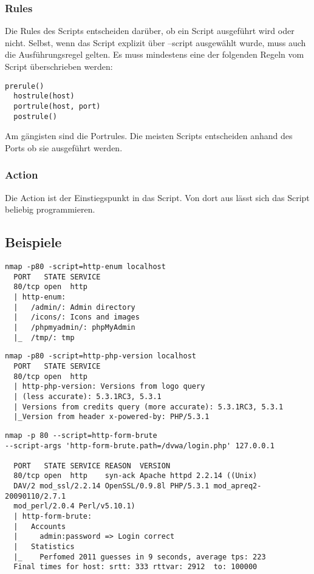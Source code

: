 \subsubsection{Rules} Die Rules des Scripts entscheiden darüber, ob
ein Script ausgeführt wird oder nicht. Selbst, wenn das Script
explizit über --script ausgewählt wurde, muss auch die
Ausführungsregel gelten. Es muss mindestens eine der folgenden Regeln
vom Script überschrieben werden:

\begin{lstlisting}[language={}]
  prerule() 
  hostrule(host)
  portrule(host, port)
  postrule()
\end{lstlisting}
  
Am gängisten sind die Portrules. Die meisten Scripts entscheiden
anhand des Ports ob sie ausgeführt werden.


\subsubsection{Action} Die Action ist der Einstiegspunkt in das
Script. Von dort aus lässt sich das Script beliebig programmieren.

\subsection{Beispiele}

\begin{lstlisting}[language={}]
nmap -p80 -script=http-enum localhost
  PORT   STATE SERVICE
  80/tcp open  http
  | http-enum:  
  |   /admin/: Admin directory
  |   /icons/: Icons and images
  |   /phpmyadmin/: phpMyAdmin
  |_  /tmp/: tmp
\end{lstlisting}

\begin{lstlisting}[language={}]
nmap -p80 -script=http-php-version localhost
  PORT   STATE SERVICE
  80/tcp open  http
  | http-php-version: Versions from logo query 
  | (less accurate): 5.3.1RC3, 5.3.1
  | Versions from credits query (more accurate): 5.3.1RC3, 5.3.1
  |_Version from header x-powered-by: PHP/5.3.1
\end{lstlisting}

\begin{lstlisting}[language={}]
nmap -p 80 --script=http-form-brute 
--script-args 'http-form-brute.path=/dvwa/login.php' 127.0.0.1

  PORT   STATE SERVICE REASON  VERSION
  80/tcp open  http    syn-ack Apache httpd 2.2.14 ((Unix) 
  DAV/2 mod_ssl/2.2.14 OpenSSL/0.9.8l PHP/5.3.1 mod_apreq2-20090110/2.7.1 
  mod_perl/2.0.4 Perl/v5.10.1)
  | http-form-brute:  
  |   Accounts
  |     admin:password => Login correct
  |   Statistics
  |_    Perfomed 2011 guesses in 9 seconds, average tps: 223
  Final times for host: srtt: 333 rttvar: 2912  to: 100000
\end{lstlisting}


